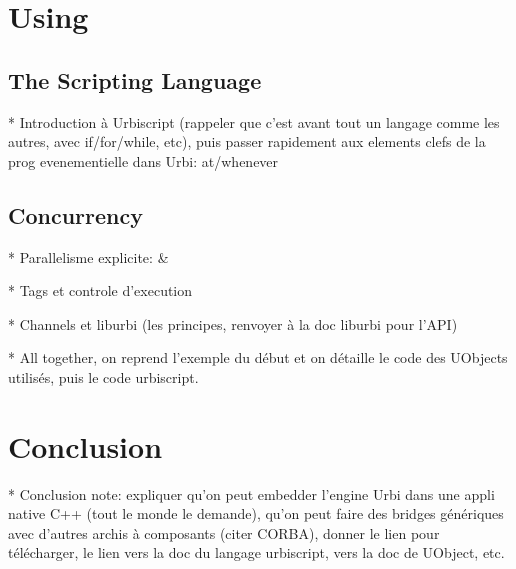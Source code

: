 \section{Using \us}

\subsection{The \us Scripting Language}
\begin{todo}
  * Introduction à Urbiscript (rappeler que c'est avant tout un
  langage comme les autres, avec if/for/while, etc), puis passer
  rapidement aux elements clefs de la prog evenementielle dans Urbi:
  at/whenever
\end{todo}

\subsection{Concurrency}
\begin{todo}
  * Parallelisme explicite: \&

  * Tags et controle d'execution

  * Channels et liburbi (les principes, renvoyer à la doc liburbi pour
  l'API)

  * All together, on reprend l'exemple du début et on détaille le code
  des UObjects utilisés, puis le code urbiscript.
\end{todo}

\section{Conclusion}
\begin{todo}
  * Conclusion note: expliquer qu'on peut embedder l'engine Urbi dans
  une appli native C++ (tout le monde le demande), qu'on peut faire
  des bridges génériques avec d'autres archis à composants (citer
  CORBA), donner le lien pour télécharger, le lien vers la doc du
  langage urbiscript, vers la doc de UObject, etc.
\end{todo}


